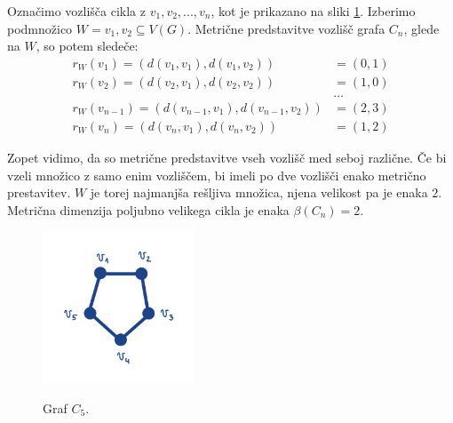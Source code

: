 \documentclass[mat1, tisk]{fmfdelo}
\newcommand{\1}{(1, 1, ..., 1)}
\newcommand{\2}{(2, 2, ..., 2)}
\begin{document}
\begin{primer}\label{pr:mdim_cikel}
    Označimo vozlišča cikla z $v_1, v_2, ..., v_n$, kot je prikazano na sliki \ref{fig:cikel}. 
    Izberimo podmnožico $W = {v_1, v_2} \subseteq V(G).$ Metrične predstavitve vozlišč grafa $C_n$, 
    glede na $W$, so potem sledeče:
    \begin{align*}
        r_W(v_1) = (d(v_1, v_1), d(v_1, v_2)) & = (0, 1) \\
        r_W(v_2) = (d(v_2, v_1), d(v_2, v_2)) & = (1, 0) \\
        & \dots \\
        r_W(v_{n-1}) = (d(v_{n-1}, v_1), d(v_{n-1}, v_2)) & = (2, 3) \\
        r_W(v_n) = (d(v_n, v_1), d(v_n, v_2)) & = (1, 2)
    \end{align*}
    
    Zopet vidimo, da so metrične predstavitve vseh vozlišč med seboj različne. Če bi vzeli 
    množico z samo enim vozliščem, bi imeli po dve vozlišči enako metrično prestavitev.
    $W$  je torej najmanjša rešljiva množica, njena velikost pa je enaka $2$. Metrična 
    dimenzija poljubno velikega cikla je enaka $\beta(C_n) = 2.$

    \begin{figure}[h]
        \centering
        \includegraphics[width=0.4\textwidth]{IMG_cikel.jpg}
        \label{fig:cikel}
        \caption{Graf $C_5$.}
    \end{figure}

\end{primer}
\end{document}
